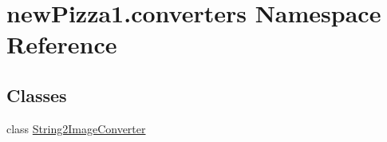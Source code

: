 \hypertarget{namespacenewPizza1_1_1converters}{}\section{new\+Pizza1.\+converters Namespace Reference}
\label{namespacenewPizza1_1_1converters}
\subsection*{Classes}
\begin{DoxyCompactItemize}
\item 
class \hyperlink{classnewPizza1_1_1converters_1_1String2ImageConverter}{String2\+Image\+Converter}
\end{DoxyCompactItemize}
